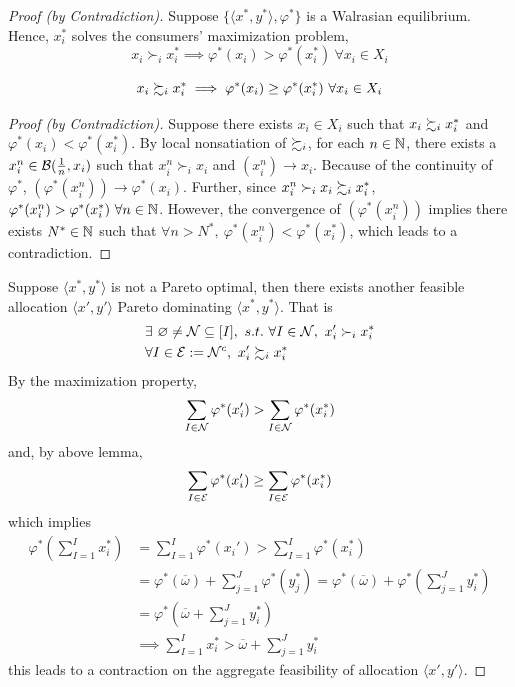 \documentclass{report}
\begin{document}
		\begin{proof}[Proof (by Contradiction)]
			Suppose $\{\langle x^*, y^* \rangle, \varphi^*\}$ is a Walrasian equilibrium. Hence, $x^*_i$ solves the consumers' maximization problem,
			\begin{equation}
				x_i \succ_i x_i^* \implies \varphi^*(x_i) > \varphi^*(x_i^*)\ \forall x_i \in X_i
			\end{equation}
			\begin{lemma}
				\begin{equation}
					x_i \succsim_i x_i^* \implies \varphi^*(x_i) \geq \varphi^*(x_i^*)\ \forall x_i \in X_i
				\end{equation}
			\end{lemma}
			\begin{proof}[Proof (by Contradiction)]
				Suppose there exists $x_i \in X_i$ such that $x_i \succsim_i x_i^*$ and $\varphi^*(x_i) < \varphi^*(x_i^*)$. By local nonsatiation of $\succsim_i$, for each $n \in \mathbb{N}$, there exists a $x_i^n \in \mathcal{{B}}(\frac{1}{n}, x_i)$ such that $x_i^n \succ_i x_i$ and $(x_i^n) \to x_i$. Because of the continuity of $\varphi^*$, $(\varphi^*(x_i^n)) \to \varphi^*(x_i)$. Further, since $x_i^n \succ_i x_i \succsim_i x_i^*$, $\varphi^*(x_i^n) > \varphi^*(x_i^*)\ \forall n \in \mathbb{N}$. However, the convergence of $(\varphi^*(x_i^n))$ implies there exists $N^* \in \mathbb{N}$ such that $\forall n > N^*,\ \varphi^*(x_i^n) < \varphi^*(x_i^*)$, which leads to a contradiction.
			\end{proof}
			Suppose $\langle x^*, y^* \rangle$ is not a Pareto optimal, then there exists another feasible allocation $\langle x', y' \rangle$ Pareto dominating $\langle x^*, y^* \rangle$. That is
			\begin{align}
				&\exists\ \varnothing \neq \mc{N} \subseteq [I],\ s.t.\ \forall I \in \mc{N},\ x_i' \succ_i x_i^* \\
				&\forall I \in \mc{E} := \mc{N}^c,\ x_i' \succsim_i x_i^*
			\end{align}
			By the maximization property, 
			\begin{equation}
				\sum_{I \in \mathcal{{N}}} \varphi^*(x_i') > \sum_{I \in \mathcal{{N}}} \varphi^*(x_i^*)
			\end{equation}
			and, by above lemma,
			\begin{equation}
				\sum_{I \in \mathcal{{E}}} \varphi^*(x_i') \geq \sum_{I \in \mathcal{{E}}} \varphi^*(x_i^*)
			\end{equation}
			which implies 
			\begin{align}
				\varphi^*\left(\sum_{I=1}^I x_i^* \right) &= 
				\sum_{I=1}^I \varphi^*(x_i') > \sum_{I=1}^I \varphi^*(x_i^*) \\
				&= \varphi^*(\overline{\omega}) + \sum_{j=1}^J \varphi^*(y_j^*)
				= \varphi^*(\overline{\omega}) + \varphi^*(\sum_{j=1}^J y_i^*) \\
				&= \varphi^*\left(\overline{\omega} + \sum_{j=1}^J y_i^* \right) \\
				&\implies \sum_{I=1}^I x_i^* > \overline{\omega} + \sum_{j=1}^J y_i^*
			\end{align}
			this leads to a contraction on the aggregate feasibility of allocation $\langle x', y' \rangle$.
		\end{proof}
		
\end{document}
